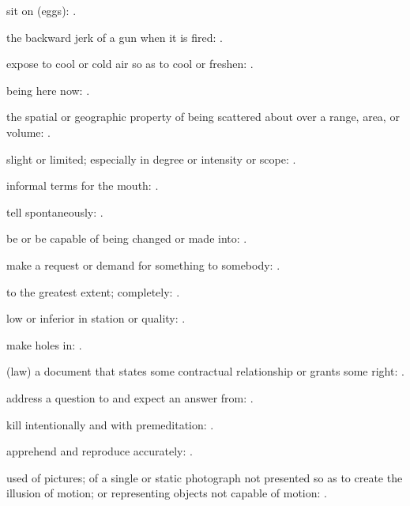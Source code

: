   sit on (eggs):   .

  the backward jerk of a gun when it is fired:   .

  expose to cool or cold air so as to cool or freshen:   .

  being here now: .

  the spatial or geographic property of being scattered about over a range, area, or volume:   .

  slight or limited; especially in degree or intensity or scope: .

  informal terms for the mouth:   .

  tell spontaneously: .

  be or be capable of being changed or made into: .

  make a request or demand for something to somebody: .

  to the greatest extent; completely: .

  low or inferior in station or quality:   .

  make holes in: .

  (law) a document that states some contractual relationship or grants some right:   .

  address a question to and expect an answer from: .

  kill intentionally and with premeditation:   .

  apprehend and reproduce accurately:   .

  used of pictures; of a single or static photograph not presented so as to create the illusion of motion; or representing objects not capable of motion: .

